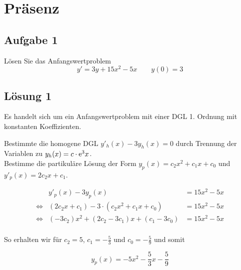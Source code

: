 \documentclass[main.tex]{subfiles}
\begin{document}
\section{Präsenz}

% 
% 
% 



\subsection{Aufgabe 1}
Lösen Sie das Anfangswertproblem 
$$
    y' = 3y + 15x^2 - 5x \qquad y(0) = 3
$$

\subsection{Lösung 1}
Es handelt sich um ein Anfangswertproblem mit einer DGL 1. Ordnung mit konstanten Koeffizienten.

Bestimmte die homogene DGL $y'_h(x) - 3y_h(x) = 0$ durch Trennung der Variablen zu $y_h(x) = c \cdot \mathrm{e}^3x$.\\

Bestimme die partikuläre Lösung der Form $y_p(x) = c_2 x^2 + c_1 x + c_0$ und $y'_p(x) = 2c_2 x + c_1$.

\begin{equation*}
\begin{array}{rrl}       
        & y'_p(x) - 3y_p(x) &= 15x^2 - 5x \\
\Leftrightarrow & (2c_2 x + c_1) - 3\cdot \left( c_2 x^2 + c_1 x + c_0 \right) &= 15x^2 - 5x \\
\Leftrightarrow & (-3 c_2) x^2 + (2c_2 - 3c_1)x + (c_1 - 3c_0)  &= 15x^2 - 5x \\
\end{array}
\end{equation*}

So erhalten wir für $c_2 =5$, $c_1 = -\frac{5}{3}$ und $c_0 = -\frac{5}{9}$ und somit

$$
    y_p(x) = -5x^2 -\frac{5}{3} x - \frac{5}{9}
$$
\end{document}
